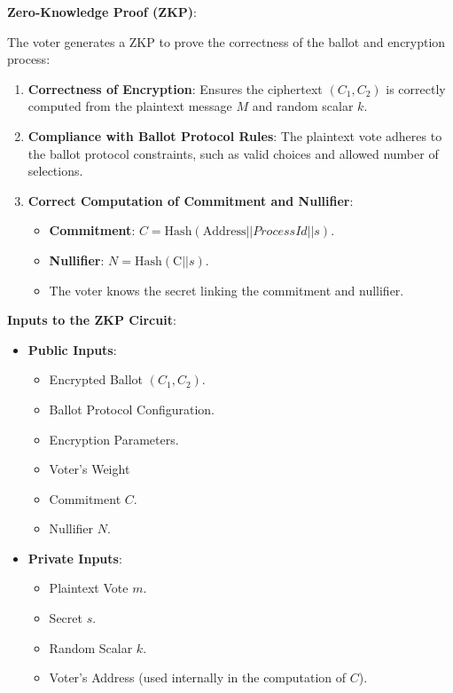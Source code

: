\begin{enumerate}
			\textbf{Zero-Knowledge Proof (ZKP)}:
			
			The voter generates a ZKP to prove the correctness of the ballot and encryption process:
			
			\begin{enumerate}
				\item \textbf{Correctness of Encryption}: Ensures the ciphertext $(C_1, C_2)$ is correctly computed from the plaintext message $M$ and random scalar $k$.
				\item \textbf{Compliance with Ballot Protocol Rules}: The plaintext vote adheres to the ballot protocol constraints, such as valid choices and allowed number of selections.
				\item \textbf{Correct Computation of Commitment and Nullifier}:
						\begin{itemize}
							\item \textbf{Commitment}: $C = \text{Hash} (\text{Address} || ProcessId || s).$
							\item \textbf{Nullifier}: $N = \text{Hash}(\text{C} || s)$.
							\item The voter knows the secret linking the commitment and nullifier.
						\end{itemize}
			\end{enumerate}
		
			\textbf{Inputs to the ZKP Circuit}:
			
			\begin{itemize}
				\item \textbf{Public Inputs}:
						\begin{itemize}
							\item Encrypted Ballot $(C_1, C_2)$.
							\item Ballot Protocol Configuration.
							\item Encryption Parameters.
							\item Voter's Weight
							\item Commitment $C$.
							\item Nullifier $N$.
						\end{itemize}
				\item \textbf{Private Inputs}:
						\begin{itemize}
							\item Plaintext Vote $m$.
							\item Secret $s$.
							\item Random Scalar $k$.
							\item Voter's Address (used internally in the computation of $C$).
						\end{itemize}
			\end{itemize}
		

\end{enumerate}
